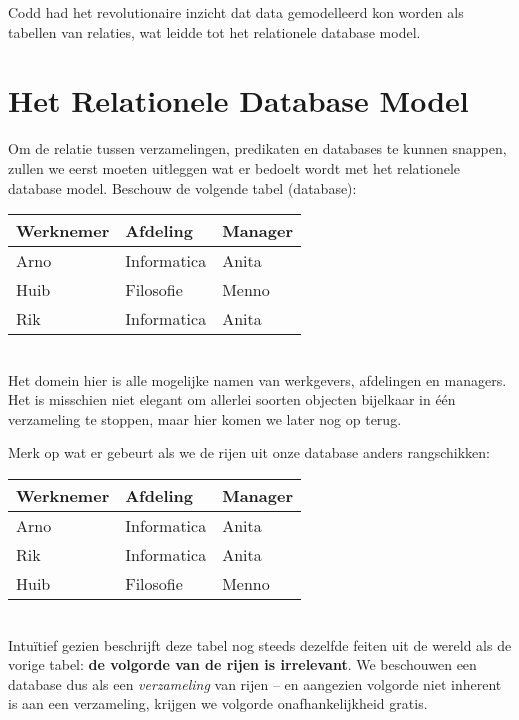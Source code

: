 Codd had het revolutionaire inzicht dat data gemodelleerd kon worden als tabellen van relaties, wat leidde tot het relationele database model.

\section{Het Relationele Database Model}
Om de relatie tussen verzamelingen, predikaten en databases te kunnen snappen, zullen we eerst moeten uitleggen wat er bedoelt wordt met het relationele database model. Beschouw de volgende tabel (database):\\[2.5pt]
\begin{tabular}{|l|l|l|}
\hline
Werknemer & Afdeling & Manager\\
\hline
Arno & Informatica & Anita\\
Huib & Filosofie & Menno\\
Rik & Informatica & Anita\\
\hline
\end{tabular}\\[2.5pt]
Het domein hier is alle mogelijke namen van werkgevers, afdelingen en managers. Het is misschien niet elegant om allerlei soorten objecten bijelkaar in \'e\'en verzameling te stoppen, maar hier komen we later nog op terug.

Merk op wat er gebeurt als we de rijen uit onze database anders rangschikken:\\[2.5pt]
\begin{tabular}{|l|l|l|}
\hline
Werknemer & Afdeling & Manager\\
\hline
Arno & Informatica & Anita\\
Rik & Informatica & Anita\\
Huib & Filosofie & Menno\\
\hline
\end{tabular}\\[2.5pt]
Intuïtief gezien beschrijft deze tabel nog steeds dezelfde feiten uit de wereld als de vorige tabel: \textbf{de volgorde van de rijen is irrelevant}. We beschouwen een database dus als een \textit{verzameling} van rijen -- en aangezien volgorde niet inherent is aan een verzameling, krijgen we volgorde onafhankelijkheid gratis.


